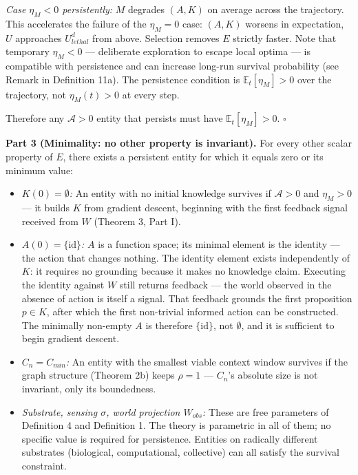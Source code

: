 \documentclass[
]{article}
\providecommand{\tightlist}{%
  \setlength{\itemsep}{0pt}\setlength{\parskip}{0pt}}
\begin{document}
\emph{Case \(\eta_M < 0\) persistently:} \(M\) degrades \((A, K)\) on
average across the trajectory. This accelerates the failure of the
\(\eta_M = 0\) case: \((A, K)\) worsens in expectation, \(U\) approaches
\(U_{lethal}^d\) from above. Selection removes \(E\) strictly faster.
Note that temporary \(\eta_M < 0\) --- deliberate exploration to escape
local optima --- is compatible with persistence and can increase
long-run survival probability (see Remark in Definition 11a). The
persistence condition is \(\mathbb{E}_t[\eta_M] > 0\) over the
trajectory, not \(\eta_M(t) > 0\) at every step.

Therefore any \(\mathcal{A} > 0\) entity that persists must have
\(\mathbb{E}_t[\eta_M] > 0\). \(\square\)

\textbf{Part 3 (Minimality: no other property is invariant).} For every
other scalar property of \(E\), there exists a persistent entity for
which it equals zero or its minimum value:

\begin{itemize}
\tightlist
\item
  \emph{\(K(0) = \emptyset\):} An entity with no initial knowledge
  survives if \(\mathcal{A} > 0\) and \(\eta_M > 0\) --- it builds \(K\)
  from gradient descent, beginning with the first feedback signal
  received from \(W\) (Theorem 3, Part I).
\item
  \emph{\(A(0) = \{\text{id}\}\):} \(A\) is a function space; its
  minimal element is the identity --- the action that changes nothing.
  The identity element exists independently of \(K\): it requires no
  grounding because it makes no knowledge claim. Executing the identity
  against \(W\) still returns feedback --- the world observed in the
  absence of action is itself a signal. That feedback grounds the first
  proposition \(p \in K\), after which the first non-trivial informed
  action can be constructed. The minimally non-empty \(A\) is therefore
  \(\{\text{id}\}\), not \(\emptyset\), and it is sufficient to begin
  gradient descent.
\item
  \emph{\(C_n = C_{min}\):} An entity with the smallest viable context
  window survives if the graph structure (Theorem 2b) keeps \(\rho = 1\)
  --- \(C_n\)'s absolute size is not invariant, only its boundedness.
\item
  \emph{Substrate, sensing \(\sigma\), world projection \(W_{obs}\):}
  These are free parameters of Definition 4 and Definition 1. The theory
  is parametric in all of them; no specific value is required for
  persistence. Entities on radically different substrates (biological,
  computational, collective) can all satisfy the survival constraint.
\end{itemize}
\end{document}
